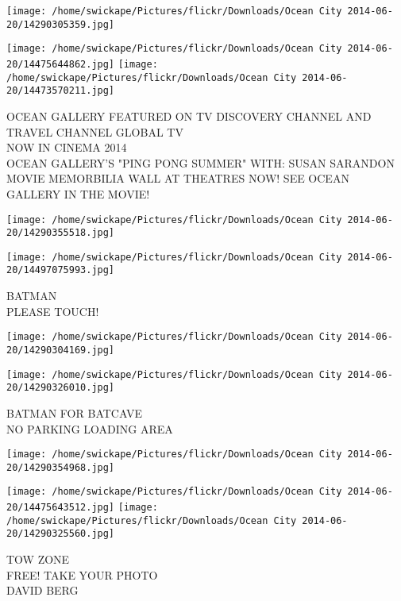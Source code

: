 \documentclass[10pt,letterpaper]{article}
\begin{document}
\texttt{[image: /home/swickape/Pictures/flickr/Downloads/Ocean City 2014-06-20/14290305359.jpg]}

\vspace{0.25in}
\texttt{[image: /home/swickape/Pictures/flickr/Downloads/Ocean City 2014-06-20/14475644862.jpg]}
\texttt{[image: /home/swickape/Pictures/flickr/Downloads/Ocean City 2014-06-20/14473570211.jpg]}

OCEAN GALLERY FEATURED ON TV DISCOVERY CHANNEL AND TRAVEL CHANNEL GLOBAL TV\\
NOW IN CINEMA 2014\\
OCEAN GALLERY'S "PING PONG SUMMER" WITH: SUSAN SARANDON MOVIE MEMORBILIA WALL AT THEATRES NOW!  SEE OCEAN GALLERY IN THE MOVIE!\\
\pagebreak

\texttt{[image: /home/swickape/Pictures/flickr/Downloads/Ocean City 2014-06-20/14290355518.jpg]}

\vspace{0.25in}
\texttt{[image: /home/swickape/Pictures/flickr/Downloads/Ocean City 2014-06-20/14497075993.jpg]}

BATMAN\\
PLEASE TOUCH!\\
\pagebreak

\texttt{[image: /home/swickape/Pictures/flickr/Downloads/Ocean City 2014-06-20/14290304169.jpg]}

\vspace{0.25in}
\texttt{[image: /home/swickape/Pictures/flickr/Downloads/Ocean City 2014-06-20/14290326010.jpg]}

BATMAN FOR BATCAVE\\
NO PARKING LOADING AREA\\
\pagebreak

\texttt{[image: /home/swickape/Pictures/flickr/Downloads/Ocean City 2014-06-20/14290354968.jpg]}

\vspace{0.25in}
\texttt{[image: /home/swickape/Pictures/flickr/Downloads/Ocean City 2014-06-20/14475643512.jpg]}
\texttt{[image: /home/swickape/Pictures/flickr/Downloads/Ocean City 2014-06-20/14290325560.jpg]}

TOW ZONE\\
FREE!  TAKE YOUR PHOTO\\
DAVID BERG\\
\pagebreak
\end{document}
